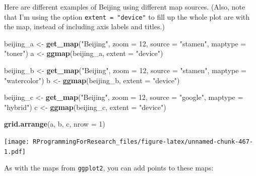 \documentclass[]{book}
\makeatletter
\newenvironment{Shaded}{\begin{snugshade}}{\end{snugshade}}
\newcommand{\KeywordTok}[1]{\textcolor[rgb]{0.13,0.29,0.53}{\textbf{{#1}}}}
\newcommand{\DataTypeTok}[1]{\textcolor[rgb]{0.13,0.29,0.53}{{#1}}}
\newcommand{\DecValTok}[1]{\textcolor[rgb]{0.00,0.00,0.81}{{#1}}}
\newcommand{\StringTok}[1]{\textcolor[rgb]{0.31,0.60,0.02}{{#1}}}
\newcommand{\NormalTok}[1]{{#1}}
\newenvironment{kframe}{%
\medskip{}
\setlength{\fboxsep}{.8em}
 \def\at@end@of@kframe{}%
 \ifinner\ifhmode%
  \def\at@end@of@kframe{\end{minipage}}%
  \begin{minipage}{\columnwidth}%
 \fi\fi%
 \def\FrameCommand##1{\hskip\@totalleftmargin \hskip-\fboxsep
 \colorbox{shadecolor}{##1}\hskip-\fboxsep
     \hskip-\linewidth \hskip-\@totalleftmargin \hskip\columnwidth}%
 \MakeFramed {\advance\hsize-\width
   \@totalleftmargin\z@ \linewidth\hsize
   \@setminipage}}%
 {\par\unskip\endMakeFramed%
 \at@end@of@kframe}
\renewenvironment{Shaded}{\begin{kframe}}{\end{kframe}}
\makeatother
\begin{document}
Here are different examples of Beijing using different map sources.
(Also, note that I'm using the option \texttt{extent\ =\ "device"} to
fill up the whole plot are with the map, instead of including axis
labels and titles.)

\begin{Shaded}
\begin{Highlighting}[]
\NormalTok{beijing_a <-}\StringTok{ }\KeywordTok{get_map}\NormalTok{(}\StringTok{"Beijing"}\NormalTok{, }\DataTypeTok{zoom =} \DecValTok{12}\NormalTok{,}
                     \DataTypeTok{source =} \StringTok{"stamen"}\NormalTok{, }\DataTypeTok{maptype =} \StringTok{"toner"}\NormalTok{)}
\NormalTok{a <-}\StringTok{ }\KeywordTok{ggmap}\NormalTok{(beijing_a, }\DataTypeTok{extent =} \StringTok{"device"}\NormalTok{)}

\NormalTok{beijing_b <-}\StringTok{ }\KeywordTok{get_map}\NormalTok{(}\StringTok{"Beijing"}\NormalTok{, }\DataTypeTok{zoom =} \DecValTok{12}\NormalTok{,}
                     \DataTypeTok{source =} \StringTok{"stamen"}\NormalTok{, }\DataTypeTok{maptype =} \StringTok{"watercolor"}\NormalTok{)}
\NormalTok{b <-}\StringTok{ }\KeywordTok{ggmap}\NormalTok{(beijing_b, }\DataTypeTok{extent =} \StringTok{"device"}\NormalTok{)}

\NormalTok{beijing_c <-}\StringTok{ }\KeywordTok{get_map}\NormalTok{(}\StringTok{"Beijing"}\NormalTok{, }\DataTypeTok{zoom =} \DecValTok{12}\NormalTok{,}
                     \DataTypeTok{source =} \StringTok{"google"}\NormalTok{, }\DataTypeTok{maptype =} \StringTok{"hybrid"}\NormalTok{)}
\NormalTok{c <-}\StringTok{ }\KeywordTok{ggmap}\NormalTok{(beijing_c, }\DataTypeTok{extent =} \StringTok{"device"}\NormalTok{)}
\end{Highlighting}
\end{Shaded}

\begin{Shaded}
\begin{Highlighting}[]
\KeywordTok{grid.arrange}\NormalTok{(a, b, c, }\DataTypeTok{nrow =} \DecValTok{1}\NormalTok{) }
\end{Highlighting}
\end{Shaded}

\texttt{[image: RProgrammingForResearch\_files/figure-latex/unnamed-chunk-467-1.pdf]}

As with the maps from \texttt{ggplot2}, you can add points to these
maps:
\end{document}
